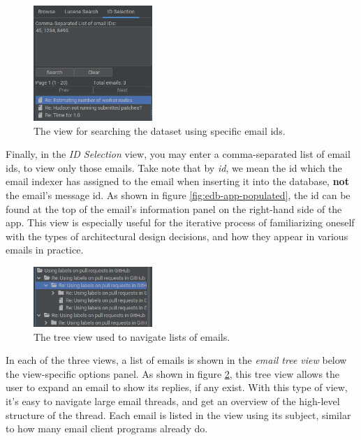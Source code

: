 \documentclass[a4paper, 12pt]{article}
\begin{document}
			\begin{figure}
				\includegraphics[width=0.4\textwidth]{img/edb-app_id-selection.png}
				\caption{The view for searching the dataset using specific email ids.}
				\label{fig:edb-app-id-selection}
			\end{figure}
		
			Finally, in the \textit{ID Selection} view, you may enter a comma-separated list of email ids, to view only those emails. Take note that by \textit{id}, we mean the id which the email indexer has assigned to the email when inserting it into the database, \textbf{not} the email's message id. As shown in figure \ref{fig:edb-app-populated}, the id can be found at the top of the email's information panel on the right-hand side of the app. This view is especially useful for the iterative process of familiarizing oneself with the types of architectural design decisions, and how they appear in various emails in practice.
			
			\begin{figure}
				\includegraphics[width=0.4\textwidth]{img/edb-app_email-tree-view.png}
				\caption{The tree view used to navigate lists of emails.}
				\label{fig:edb-app-tree-view}
			\end{figure}
			
			In each of the three views, a list of emails is shown in the \textit{email tree view} below the view-specific options panel. As shown in figure \ref{fig:edb-app-tree-view}, this tree view allows the user to expand an email to show its replies, if any exist. With this type of view, it's easy to navigate large email threads, and get an overview of the high-level structure of the thread. Each email is listed in the view using its subject, similar to how many email client programs already do.
		
\end{document}
